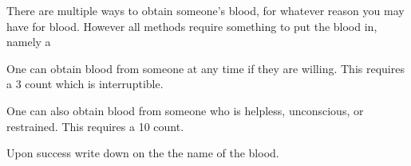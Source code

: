 \documentclass[green]{guildcamp4}
\begin{document}
\name{\gGotBlood{}}

There are multiple ways to obtain someone's blood, for whatever reason you may have for blood. 
However all methods require something to put the blood in, namely a \iTestTube{} 

One can obtain blood from someone at any time if they are willing. This requires a 3 count which is interruptible.

One can also obtain blood from someone who is helpless, unconscious, or restrained. This requires a 10 count.

Upon success write down on the \iTestTube{} the name of the blood.
\end{document}
